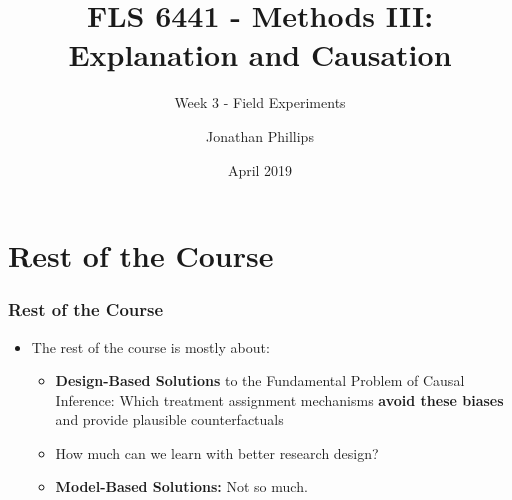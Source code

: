 \documentclass[xcolor=x11names,compress]{beamer}\usepackage[]{graphicx}\usepackage[]{color}
\title{FLS 6441 - Methods III: Explanation and Causation}
\subtitle{Week 3 - Field Experiments}
\author{Jonathan Phillips}
\date{April 2019}
\renewcommand{\(}{\begin{columns}}
\renewcommand{\)}{\end{columns}}
\newcommand{\<}[1]{\begin{column}{#1}}
\renewcommand{\>}{\end{column}}
\begin{document}
\frame{\titlepage}

\section{Rest of the Course}

\begin{frame}
\frametitle{Rest of the Course}
\begin{itemize}
\item The rest of the course is mostly about:
\begin{itemize}
\item \textbf{Design-Based Solutions} to the Fundamental Problem of Causal Inference: Which treatment assignment mechanisms \textbf{avoid these biases} and provide plausible counterfactuals
\pause
\item How much can we learn with better research design?
\pause
\item \textbf{Model-Based Solutions:} Not so much.
\end{itemize}
\end{itemize}
\end{frame}
\end{document}

